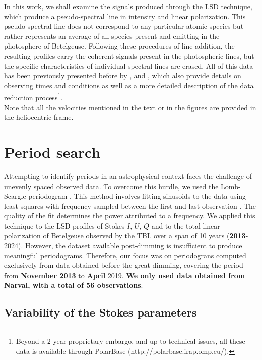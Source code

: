 \documentclass{aa}
\begin{document}
In this work, we shall examine the signals produced through the LSD technique, which produce a pseudo-spectral line in intensity 
and linear polarization. This pseudo-spectral line does not correspond to any particular atomic species but rather represents an average of all species present and emitting in the 
photosphere of Betelgeuse. Following these procedures of line addition, the resulting profiles carry the coherent signals present in the photospheric lines, but the specific characteristics of individual spectral lines are erased. All of this data has been previously presented before by \cite{auriere_discovery_2016}, \cite{mathias_evolution_2018} and 
\cite{lopez_ariste_three-dimensional_2022}, which also provide details on observing times and conditions as well as a more detailed description 
of the data reduction process\footnote[2]{Beyond a 2-year proprietary embargo, and up to technical issues, all these data is available through 
PolarBase (http://polarbase.irap.omp.eu/).}.\\
Note that all the velocities mentioned in the text or in the figures are provided in the heliocentric frame.




\section{Period search}
\label{section 3}


Attempting to identify periods in an astrophysical context faces the challenge of unevenly spaced observed data. To overcome this hurdle, 
we used the Lomb-Scargle periodogram \citep{lomb_least-squares_1976,scargle_studies_1982}. This method involves fitting sinusoids to the data using least-squares with frequency sampled between the first and last observation \textbf{\citep{the_astropy_collaboration_astropy_2018}}. The quality of the fit determines the power attributed to a frequency. We applied this technique to the  LSD profiles of Stokes $I$, $U$, $Q$ and to the total linear polarization of Betelgeuse observed by the TBL over a span of 10 years (\textbf{2013}-2024). However, the dataset available post-dimming is insufficient to produce meaningful periodograms. Therefore, our focus was on periodograns computed exclusively from data obtained before the great dimming, covering the period from \textbf{ November 2013} to \textbf{April} 2019. \textbf{We only used data obtained from Narval, with a total of 56 observations}. 

\subsection{Variability of the Stokes parameters}
\end{document}
